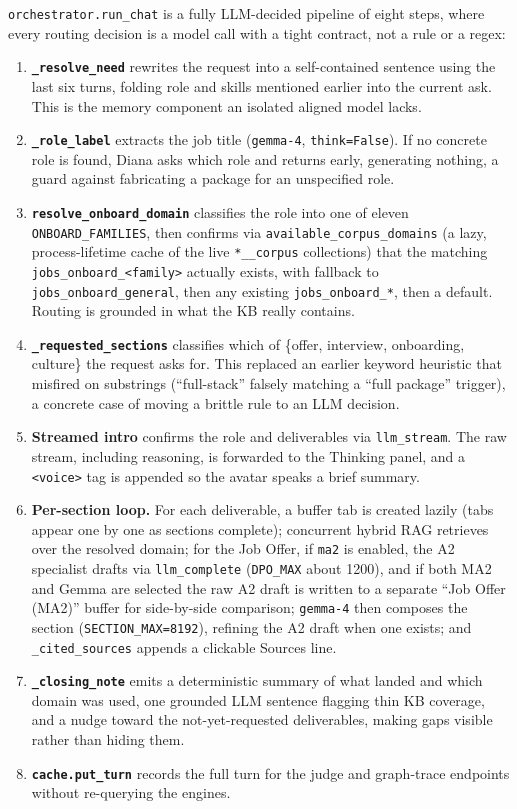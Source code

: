 \verb|orchestrator.run_chat| is a fully LLM-decided pipeline of eight steps, where every
routing decision is a model call with a tight contract, not a rule or a regex:

\begin{enumerate}
  \item \textbf{\texttt{\_resolve\_need}} rewrites the request into a self-contained
    sentence using the last six turns, folding role and skills mentioned earlier into the
    current ask. This is the memory component an isolated aligned model lacks.
  \item \textbf{\texttt{\_role\_label}} extracts the job title (\verb|gemma-4|,
    \verb|think=False|). If no concrete role is found, Diana asks which role and returns
    early, generating nothing, a guard against fabricating a package for an unspecified
    role.
  \item \textbf{\texttt{resolve\_onboard\_domain}} classifies the role into one of eleven
    \verb|ONBOARD_FAMILIES|, then confirms via \verb|available_corpus_domains| (a lazy,
    process-lifetime cache of the live \verb|*__corpus| collections) that the matching
    \verb|jobs_onboard_<family>| actually exists, with fallback to
    \verb|jobs_onboard_general|, then any existing \verb|jobs_onboard_*|, then a default.
    Routing is grounded in what the KB really contains.
  \item \textbf{\texttt{\_requested\_sections}} classifies which of \{offer, interview,
    onboarding, culture\} the request asks for. This replaced an earlier keyword heuristic
    that misfired on substrings (``full-stack'' falsely matching a ``full package''
    trigger), a concrete case of moving a brittle rule to an LLM decision.
  \item \textbf{Streamed intro} confirms the role and deliverables via \verb|llm_stream|.
    The raw stream, including reasoning, is forwarded to the Thinking panel, and a
    \verb|<voice>| tag is appended so the avatar speaks a brief summary.
  \item \textbf{Per-section loop.} For each deliverable, a buffer tab is created lazily
    (tabs appear one by one as sections complete); concurrent hybrid RAG retrieves over
    the resolved domain; for the Job Offer, if \verb|ma2| is enabled, the A2 specialist
    drafts via \verb|llm_complete| (\verb|DPO_MAX| about 1200), and if both MA2 and Gemma
    are selected the raw A2 draft is written to a separate ``Job Offer (MA2)'' buffer for
    side-by-side comparison; \verb|gemma-4| then composes the section
    (\verb|SECTION_MAX=8192|), refining the A2 draft when one exists; and
    \verb|_cited_sources| appends a clickable Sources line.
  \item \textbf{\texttt{\_closing\_note}} emits a deterministic summary of what landed and
    which domain was used, one grounded LLM sentence flagging thin KB coverage, and a nudge
    toward the not-yet-requested deliverables, making gaps visible rather than hiding them.
  \item \textbf{\texttt{cache.put\_turn}} records the full turn for the judge and
    graph-trace endpoints without re-querying the engines.
\end{enumerate}


